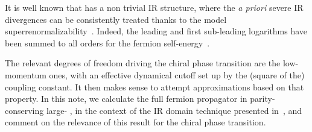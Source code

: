 \documentclass[12pt,a4paper]{article} \usepackage[latin1] {inputenc}
\begin{document}
It is well known that \coordHE{} has a non trivial IR structure, where
the {\em a priori\/} severe IR divergences can be consistently treated
thanks to the model superrenormalizability~\cite{j-t}. Indeed, the
leading and first sub-leading logarithms have been summed to all
orders for the fermion self-energy~\cite{temp}.

The relevant degrees of freedom driving the chiral phase transition
are the low-momentum ones, with an effective dynamical cutoff set up
by the (square of the) coupling constant.  It then makes sense to
attempt approximations based on that property.  In this note, we
calculate the full fermion propagator in parity-conserving large-\coordHE{}  \coordHE{}, in the context of the IR domain technique presented
in~\cite{Karanikas:1995zi}, and comment on the relevance of this
result for the chiral phase transition.
\end{document}
